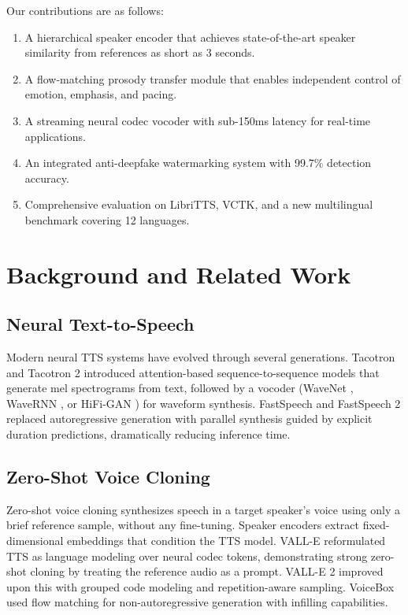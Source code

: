 \documentclass[11pt,a4paper]{article}
\begin{document}
Our contributions are as follows:
\begin{enumerate}
    \item A hierarchical speaker encoder that achieves state-of-the-art speaker similarity from references as short as 3 seconds.
    \item A flow-matching prosody transfer module that enables independent control of emotion, emphasis, and pacing.
    \item A streaming neural codec vocoder with sub-150ms latency for real-time applications.
    \item An integrated anti-deepfake watermarking system with 99.7\% detection accuracy.
    \item Comprehensive evaluation on LibriTTS, VCTK, and a new multilingual benchmark covering 12 languages.
\end{enumerate}

\section{Background and Related Work}
\label{sec:background}

\subsection{Neural Text-to-Speech}

Modern neural TTS systems have evolved through several generations. Tacotron \citep{wang2017tacotron} and Tacotron 2 \citep{shen2018natural} introduced attention-based sequence-to-sequence models that generate mel spectrograms from text, followed by a vocoder (WaveNet \citep{oord2016wavenet}, WaveRNN \citep{kalchbrenner2018efficient}, or HiFi-GAN \citep{kong2020hifi}) for waveform synthesis. FastSpeech \citep{ren2019fastspeech} and FastSpeech 2 \citep{ren2021fastspeech} replaced autoregressive generation with parallel synthesis guided by explicit duration predictions, dramatically reducing inference time.

\subsection{Zero-Shot Voice Cloning}

Zero-shot voice cloning synthesizes speech in a target speaker's voice using only a brief reference sample, without any fine-tuning. Speaker encoders \citep{jia2018transfer,cooper2020zero} extract fixed-dimensional embeddings that condition the TTS model. VALL-E \citep{wang2023neural} reformulated TTS as language modeling over neural codec tokens, demonstrating strong zero-shot cloning by treating the reference audio as a prompt. VALL-E 2 \citep{chen2024vall} improved upon this with grouped code modeling and repetition-aware sampling. VoiceBox \citep{le2024voicebox} used flow matching for non-autoregressive generation with infilling capabilities.
\end{document}
